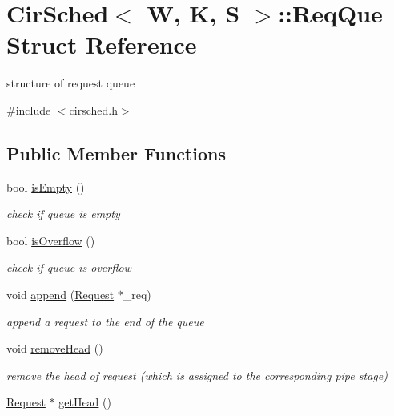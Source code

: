 \hypertarget{structCirSched_1_1ReqQue}{\section{Cir\-Sched$<$ W, K, S $>$\-:\-:Req\-Que Struct Reference}
\label{structCirSched_1_1ReqQue}
}


structure of request queue  




{\ttfamily \#include $<$cirsched.\-h$>$}

\subsection*{Public Member Functions}
\begin{DoxyCompactItemize}
\item 
bool \hyperlink{structCirSched_1_1ReqQue_a09575abda12026f4de7cfbdee50a35c1}{is\-Empty} ()
\begin{DoxyCompactList}\small\item\em check if queue is empty \end{DoxyCompactList}\item 
bool \hyperlink{structCirSched_1_1ReqQue_a9a2824942840b027b770bd4c1fa3b2f4}{is\-Overflow} ()
\begin{DoxyCompactList}\small\item\em check if queue is overflow \end{DoxyCompactList}\item 
void \hyperlink{structCirSched_1_1ReqQue_a895a9b83a80ba67d728db61b4a657b23}{append} (\hyperlink{structCirSched_1_1Request}{Request} $\ast$\-\_\-req)
\begin{DoxyCompactList}\small\item\em append a request to the end of the queue \end{DoxyCompactList}\item 
void \hyperlink{structCirSched_1_1ReqQue_aaa43d17173a671297ea45230c6dcdbcb}{remove\-Head} ()
\begin{DoxyCompactList}\small\item\em remove the head of request (which is assigned to the corresponding pipe stage) \end{DoxyCompactList}\item 
\hyperlink{structCirSched_1_1Request}{Request} $\ast$ \hyperlink{structCirSched_1_1ReqQue_a525fb2922fdf264fb237a657131e158b}{get\-Head} ()
\end{DoxyCompactItemize}
